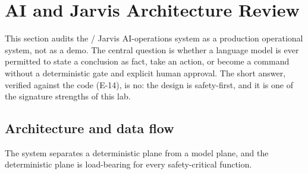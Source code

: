 \section{AI and Jarvis Architecture Review}\label{sec:ai-jarvis}

This section audits the  / Jarvis AI-operations system as a production
operational system, not as a demo. The central question is whether a language model is ever
permitted to state a conclusion as fact, take an action, or become a command without a
deterministic gate and explicit human approval. The short answer, verified against the code
(E-14), is no: the design is safety-first, and it is one of the signature strengths of this lab.

\subsection{Architecture and data flow}

The system separates a deterministic plane from a model plane, and the deterministic plane is
load-bearing for every safety-critical function.

